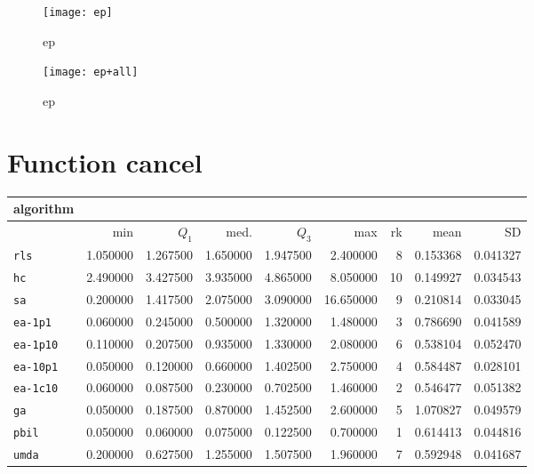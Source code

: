 \begin{center}
\begin{figure}[h]
\centering
\texttt{[image: ep]}
\caption{ep}
\end{figure}
\end{center}

\begin{center}
\begin{figure}[h]
\centering
\texttt{[image: ep+all]}
\caption{ep}
\end{figure}
\end{center}

\newpage

\section{Function cancel}
\begin{center}
\begin{tabular}{@{}l*{5}{>{{}}N{1}{2}}>{{}}N{2}{0}N{1}{3}N{1}{3}@{}}
\toprule
{algorithm} &  &  \\
\midrule
& {min} & {$Q_1$} & {med.} & {$Q_3$} & {max} & {rk} & {mean} & {SD} \\
\midrule
\verb|rls| & 1.050000 & 1.267500 & 1.650000 & 1.947500 & 2.400000 & 8 & 0.153368 & 0.041327 \\
 \verb|hc| & 2.490000 & 3.427500 & 3.935000 & 4.865000 & 8.050000 & 10 & 0.149927 & 0.034543 \\
 \verb|sa| & 0.200000 & 1.417500 & 2.075000 & 3.090000 & 16.650000 & 9 & 0.210814 & 0.033045 \\
 \verb|ea-1p1| & 0.060000 & 0.245000 & 0.500000 & 1.320000 & 1.480000 & 3 & 0.786690 & 0.041589 \\
 \verb|ea-1p10| & 0.110000 & 0.207500 & 0.935000 & 1.330000 & 2.080000 & 6 & 0.538104 & 0.052470 \\
 \verb|ea-10p1| & {\color{blue}} 0.050000 & 0.120000 & 0.660000 & 1.402500 & 2.750000 & 4 & 0.584487 & 0.028101 \\
 \verb|ea-1c10| & 0.060000 & 0.087500 & 0.230000 & 0.702500 & 1.460000 & 2 & 0.546477 & 0.051382 \\
 \verb|ga| & {\color{blue}} 0.050000 & 0.187500 & 0.870000 & 1.452500 & 2.600000 & 5 & 1.070827 & 0.049579 \\
 \verb|pbil| & {\color{blue}} 0.050000 & {\color{blue}} 0.060000 & {\color{blue}} 0.075000 & {\color{blue}} 0.122500 & {\color{blue}} 0.700000 & 1 & 0.614413 & 0.044816 \\
 \verb|umda| & 0.200000 & 0.627500 & 1.255000 & 1.507500 & 1.960000 & 7 & 0.592948 & 0.041687 \\
 \bottomrule
\end{tabular}
\end{center}

